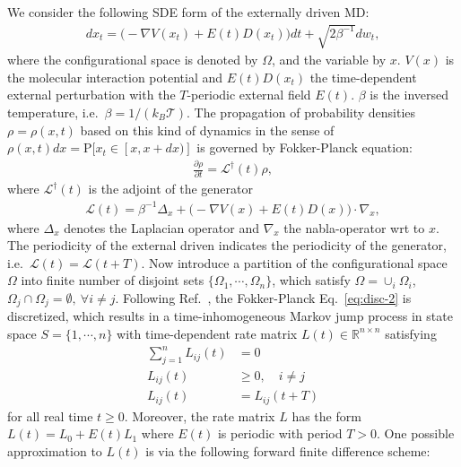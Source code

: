 \documentclass[aps, pre, preprint,unsortedaddress,a4paper,onecolumn]{revtex4}
\newcommand{\recheck}[1]{{\color{red} #1}}
\newcommand{\vect}[1]{#1}
\newcommand{\ml}[0]{\mathcal {L}}
\newcommand{\prob}{\textrm{P}}
\begin{document}
We consider  the following SDE form of the externally driven MD:
\begin{align}
  \label{eq:disc-1}
  d\vect x_t = \Big(-\nabla V(\vect x_t) + E(t) D(\vect x_t)\Big)dt + \sqrt{2\beta^{-1}} d\vect w_t, 
\end{align}
where the configurational space is denoted by $\Omega$, and the variable by
$\vect x$.   $V(\vect x)$ is the molecular interaction potential and
$E(t)D(x_t)$ the time-dependent external perturbation with the
$T$-periodic external field $E(t)$. $\beta$ is the inversed temperature,
i.e.~$\beta = 1/(k_B\mathcal T)$.
The propagation of probability
densities $\rho=\rho(\vect x,t)$ based on this kind of dynamics in the sense
of $\rho(\vect x,t)dx=\prob[\vect x_t\in [\vect x,\vect x+d\vect x)]$ is governed by
Fokker-Planck equation:
\begin{align}
  \label{eq:disc-2}
  \frac{\partial \rho}{\partial t} = \ml^\dagger(t) \rho,
\end{align}
where $\ml^\dagger(t)$ is the adjoint of the generator
\begin{align}
  \label{eq:disc-3}
  \ml(t)=\beta^{-1}\Delta_{\vect x}+\Big(-\nabla V(\vect x) + E(t)D(\vect x)\Big)\cdot\nabla_{\vect x},
\end{align}
where $\Delta_{\vect x}$ denotes the Laplacian operator and $\nabla_{\vect x}$
the nabla-operator wrt to $\vect x$. 
The periodicity of the external driven indicates the periodicity of the generator,
i.e.~$\ml(t) = \ml(t+T)$.  Now
introduce a partition of the configurational space $\Omega$ into finite number of disjoint
sets $\{ \Omega_1, \cdots, \Omega_n\}$, which satisfy $\Omega = \cup_i \Omega_i$,
$\Omega_j\cap \Omega_j = \emptyset,\ \forall i\neq j$.
Following Ref.~\cite{latorre2011structure}, the Fokker-Planck Eq.~\ref{eq:disc-2}
is discretized, which results in a time-inhomogeneous Markov jump process in state
space $S = \{1, \cdots, n\}$ with time-dependent rate
matrix $\vect L(t) \in \mathbb R^{n\times n}$ satisfying
\begin{align}\label{eq:disc-4}
\sum\limits_{j=1}^n L_{ij}(t) & =  0\\ \label{eq:disc-5}
L_{ij}(t) & \ge  0, \quad i\not= j\\
L_{ij}(t) & =  L_{ij}(t+T)
\end{align}
for all real time $t\geq 0$.
\recheck{Moreover,
the rate matrix $L$ has the form $\vect L(t)=\vect L_0+E(t)\vect L_1$
where $E(t)$ is periodic with period $T>0$.}
One possible approximation to $L(t)$ is via the following forward finite difference scheme:
\end{document}
